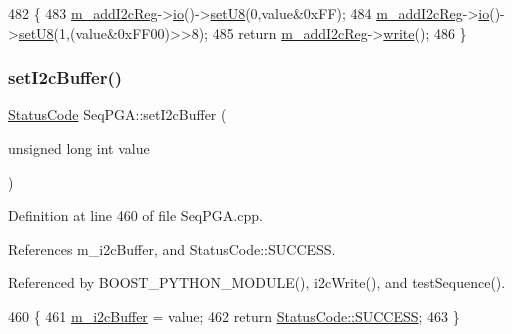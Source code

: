 \begin{DoxyCode}
482                                                      \{
483   \hyperlink{classSeqPGA_ac3a6aad3fec65ceb78528b6d20deeb3f}{m\_addI2cReg}->\hyperlink{classIOobject_af04fb94137c3d86849f478ac5afab5d1}{io}()->\hyperlink{classIOdata_a6c4fb2f2af01889ada889c2b7aceb24d}{setU8}(0,value&0xFF);
484   \hyperlink{classSeqPGA_ac3a6aad3fec65ceb78528b6d20deeb3f}{m\_addI2cReg}->\hyperlink{classIOobject_af04fb94137c3d86849f478ac5afab5d1}{io}()->\hyperlink{classIOdata_a6c4fb2f2af01889ada889c2b7aceb24d}{setU8}(1,(value&0xFF00)>>8);
485   \textcolor{keywordflow}{return} \hyperlink{classSeqPGA_ac3a6aad3fec65ceb78528b6d20deeb3f}{m\_addI2cReg}->\hyperlink{classIOobject_a9f6984bc9f0fadcf800f1be2523ac744}{write}();
486 \}
\end{DoxyCode}
\mbox{\label{classSeqPGA_ab93beca49a31c1f9fddc915e9efeeaa0}} 
\subsubsection{\texorpdfstring{set\+I2c\+Buffer()}{setI2cBuffer()}}
{\footnotesize\ttfamily \hyperlink{classStatusCode}{Status\+Code} Seq\+P\+G\+A\+::set\+I2c\+Buffer (\begin{DoxyParamCaption}\item[{unsigned long int}]{value }\end{DoxyParamCaption})}



Definition at line 460 of file Seq\+P\+G\+A.\+cpp.



References m\+\_\+i2c\+Buffer, and Status\+Code\+::\+S\+U\+C\+C\+E\+SS.



Referenced by B\+O\+O\+S\+T\+\_\+\+P\+Y\+T\+H\+O\+N\+\_\+\+M\+O\+D\+U\+L\+E(), i2c\+Write(), and test\+Sequence().


\begin{DoxyCode}
460                                                         \{
461   \hyperlink{classSeqPGA_afcef519379e9c6ba624ba58a4eac79f1}{m\_i2cBuffer} = value;
462   \textcolor{keywordflow}{return} \hyperlink{classStatusCode_a6f565cbeadc76d14c72f047e5e85eb4badd0da38d3ba0d922efd1f4619bc37ad8}{StatusCode::SUCCESS};
463 \}
\end{DoxyCode}
\mbox{\label{classSeqPGA_aef7911620b07d8aeef2a9ec95fa58ca4}} 
